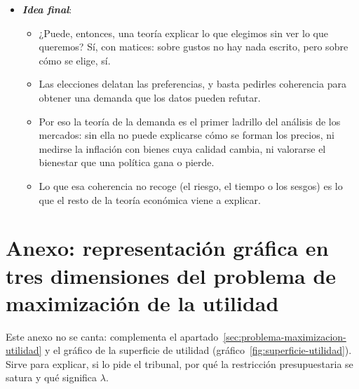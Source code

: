\documentclass[11pt]{article}
\begin{document}
\begin{itemize}
\item \textbf{\emph{Idea final}}:
  \begin{itemize}
  \item ¿Puede, entonces, una teoría explicar lo que elegimos sin ver lo que queremos? Sí, con matices: sobre gustos no hay nada escrito, pero sobre cómo se elige, sí.

  \item Las elecciones delatan las preferencias, y basta pedirles coherencia para obtener una demanda que los datos pueden refutar.

  \item Por eso la teoría de la demanda es el primer ladrillo del análisis de los mercados: sin ella no puede explicarse cómo se forman los precios, ni medirse la inflación con bienes cuya calidad cambia, ni valorarse el bienestar que una política gana o pierde.

  \item Lo que esa coherencia no recoge (el riesgo, el tiempo o los sesgos) es lo que el resto de la teoría económica viene a explicar.
  \end{itemize}
\end{itemize}

\clearpage
\appendix

\section{Anexo: representación gráfica en tres dimensiones\cortetitulo{} del problema de maximización de la utilidad}\label{anexo:r3}

\begin{notaopositor}
Este anexo no se canta: complementa el apartado~\ref{sec:problema-maximizacion-utilidad} y el gráfico de la superficie de utilidad (gráfico~\ref{fig:superficie-utilidad}). Sirve para explicar, si lo pide el tribunal, por qué la restricción presupuestaria se satura y qué significa $\lambda$.
\end{notaopositor}
\end{document}
